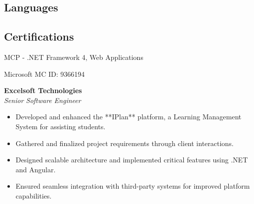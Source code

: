 
    \vspace*{-1em}
    \begin{tcolorbox}
        \vspace*{-0.5em}
        \begin{minipage}[t]{0.3\textwidth} %
            \begin{tcolorbox}[height=0.8\textheight, grow to left by=0.6cm, colback=backdrop, colframe=backdrop, arc=0mm]

                \subsection*{Languages}

                 \subsection*{Certifications}
                    {MCP - .NET Framework 4, Web Applications} \par
                    {Microsoft} {MC ID: 9366194}
            \end{tcolorbox}
        \end{minipage}
        \begin{minipage}[t]{0.7\textwidth} %
            \begin{tcolorbox}[grow to right by=0.75cm, height=0.8\textheight, colframe=white, colback=white]



                \textbf{Excelsoft Technologies} \hfill {} \\
                \textit{Senior Software Engineer}  
                \begin{itemize}
                    \item Developed and enhanced the **IPlan** platform, a Learning Management System for assisting students.
                    \item Gathered and finalized project requirements through client interactions.
                    \item Designed scalable architecture and implemented critical features using .NET and Angular.
                    \item Ensured seamless integration with third-party systems for improved platform capabilities.
                \end{itemize}


\end{tcolorbox}
\end{minipage}
\end{tcolorbox}
